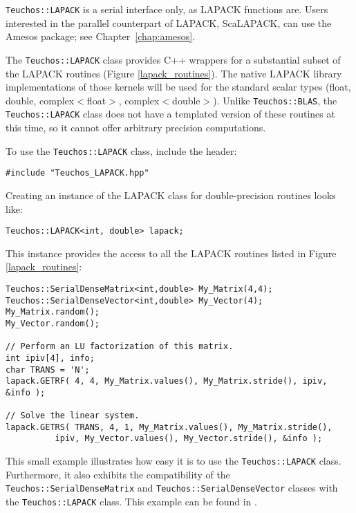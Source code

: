 \verb!Teuchos::LAPACK! is a serial interface only, as LAPACK functions
are. Users interested in the parallel counterpart of LAPACK, ScaLAPACK,
can use the Amesos package; see Chapter~\ref{chap:amesos}.

The \verb!Teuchos::LAPACK! class provides C++ wrappers for a substantial subset of the 
LAPACK routines (Figure \ref{lapack_routines}).
The native LAPACK library implementations of those kernels
will be used for the standard scalar types (float, double, complex$<$float$>$, complex$<$double$>$).  
Unlike \verb!Teuchos::BLAS!, the \verb!Teuchos::LAPACK! class does not have a templated version of 
these routines at this time, so it cannot offer arbitrary precision computations.

To use the \verb!Teuchos::LAPACK! class, include the header:
{\small 
\begin{verbatim}
#include "Teuchos_LAPACK.hpp"
\end{verbatim}}
Creating an instance of the LAPACK class for double-precision routines looks like:
{\small 
\begin{verbatim}
Teuchos::LAPACK<int, double> lapack;
\end{verbatim}}
This instance provides the access to all the LAPACK routines listed in Figure \ref{lapack_routines}:
{\small
\begin{verbatim}
Teuchos::SerialDenseMatrix<int,double> My_Matrix(4,4);
Teuchos::SerialDenseVector<int,double> My_Vector(4);
My_Matrix.random();
My_Vector.random();

// Perform an LU factorization of this matrix. 
int ipiv[4], info;
char TRANS = 'N';
lapack.GETRF( 4, 4, My_Matrix.values(), My_Matrix.stride(), ipiv, &info ); 

// Solve the linear system.
lapack.GETRS( TRANS, 4, 1, My_Matrix.values(), My_Matrix.stride(), 
	      ipiv, My_Vector.values(), My_Vector.stride(), &info );
\end{verbatim}}

This small example illustrates how easy it is to use the {\tt Teuchos::LAPACK}
class.  Furthermore, it also exhibits the compatibility of the {\tt Teuchos::SerialDenseMatrix} 
and {\tt Teuchos::SerialDenseVector} classes with the {\tt Teuchos::LAPACK} class.  
This example can be found in .  

